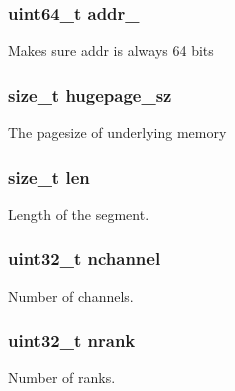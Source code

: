 \subsubsection[{addr\+\_\+64}]{\setlength{\rightskip}{0pt plus 5cm}uint64\+\_\+t addr\+\_}\label{structrte__memseg_a684abacaaf679b13b2ccec687a763b17}
Makes sure addr is always 64 bits \hypertarget{structrte__memseg_a0e9113d25bb493add104f3b95844aaf5}{}
\subsubsection[{hugepage\+\_\+sz}]{\setlength{\rightskip}{0pt plus 5cm}size\+\_\+t hugepage\+\_\+sz}\label{structrte__memseg_a0e9113d25bb493add104f3b95844aaf5}
The pagesize of underlying memory \hypertarget{structrte__memseg_a7360b55975153b822efc5217b7734e6a}{}
\subsubsection[{len}]{\setlength{\rightskip}{0pt plus 5cm}size\+\_\+t len}\label{structrte__memseg_a7360b55975153b822efc5217b7734e6a}
Length of the segment. \hypertarget{structrte__memseg_a5874f4bcabbfe0fd765d5129d629eabf}{}
\subsubsection[{nchannel}]{\setlength{\rightskip}{0pt plus 5cm}uint32\+\_\+t nchannel}\label{structrte__memseg_a5874f4bcabbfe0fd765d5129d629eabf}
Number of channels. \hypertarget{structrte__memseg_a59a112650302067fe308c24133e44d7e}{}
\subsubsection[{nrank}]{\setlength{\rightskip}{0pt plus 5cm}uint32\+\_\+t nrank}\label{structrte__memseg_a59a112650302067fe308c24133e44d7e}
Number of ranks. \hypertarget{structrte__memseg_a3901f538726d14b9ad14e0bd7578c959}{}
